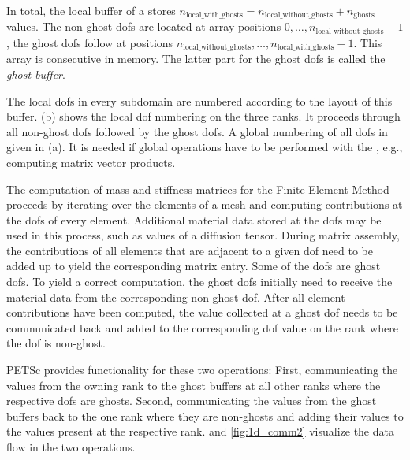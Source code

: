 In total, the local buffer of a \Vec{} stores $n_\text{local\_with\_ghosts} = n_\text{local\_without\_ghosts} + n_\text{ghosts}$ values. The non-ghost dofs are located at array positions $0,\dots,n_\text{local\_without\_ghosts}-1$, the ghost dofs follow at positions $n_\text{local\_without\_ghosts}, \dots, n_\text{local\_with\_ghosts}-1$. This array is consecutive in memory. The latter part for the ghost dofs is called the \emph{ghost buffer}. 

The local dofs in every subdomain are numbered according to the layout of this buffer.  (b) shows the local dof numbering on the three ranks. It proceeds through all non-ghost dofs followed by the ghost dofs. A global numbering of all dofs in given in  (a). It is needed if global operations have to be performed with the \Vec{}, e.g., computing matrix vector products.

The computation of mass and stiffness matrices for the Finite Element Method proceeds by iterating over the elements of a mesh and computing contributions at the dofs of every element. Additional material data stored at the dofs may be used in this process, such as values of a diffusion tensor. During matrix assembly, the contributions of all elements that are adjacent to a given dof need to be added up to yield the corresponding matrix entry.
Some of the dofs are ghost dofs. To yield a correct computation, the ghost dofs initially need to receive the material data from the corresponding non-ghost dof. After all element contributions have been computed, the value collected at a ghost dof needs to be communicated back and added to the corresponding dof value on the rank where the dof is non-ghost.

PETSc provides functionality for these two operations: First, communicating the values from the owning rank to the ghost buffers at all other ranks where the respective dofs are ghosts. Second, communicating the values from the ghost buffers back to the one rank where they are non-ghosts and adding their values to the values present at the respective rank.  and \cref{fig:1d_comm2} visualize the data flow in the two operations. 

